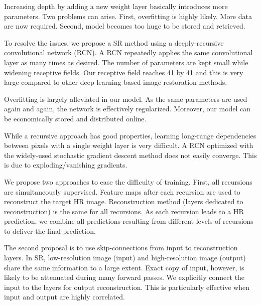 \documentclass[10pt,twocolumn,letterpaper]{article}
\begin{document}
Increasing depth by adding a new weight layer basically introduces more parameters. Two problems can arise. First, overfitting is highly likely. More data are now required. Second, model becomes too huge to be stored and retrieved.

 



To resolve the issues, we propose a SR method using a deeply-recursive convolutional network (RCN). A RCN repeatedly applies the same convolutional layer as many times as desired. The number of parameters are kept small while widening receptive fields. Our receptive field reaches 41 by 41 and this is very large compared to other deep-learning based image restoration methods. 

Overfitting is largely alleviated in our model. As the same parameters are used again and again, the network is effectively regularized. Moreover, our model can be economically stored and distributed online.   

While a recursive approach has good properties, learning long-range dependencies between pixels with a single weight layer is very difficult. A RCN optimized with the widely-used stochastic gradient descent method does not easily converge. This is due to exploding/vanishing gradients. 

We propose two approaches to ease the difficulty of training. First, all recursions are simultaneously supervised. Feature maps after each recursion are used to reconstruct the target HR image. Reconstruction method (layers dedicated to reconstruction) is the same for all recursions. As each recursion leads to a HR prediction, we combine all predictions resulting from different levels of recursions to deliver the final prediction.  
   
The second proposal is to use skip-connections from input to reconstruction layers. In SR, low-resolution image (input) and high-resolution image (output) share the same information to a large extent. Exact copy of input, however, is likely to be attenuated during many forward passes. We explicitly connect the input to the layers for output reconstruction. This is particularly effective when input and output are highly correlated.
\end{document}

